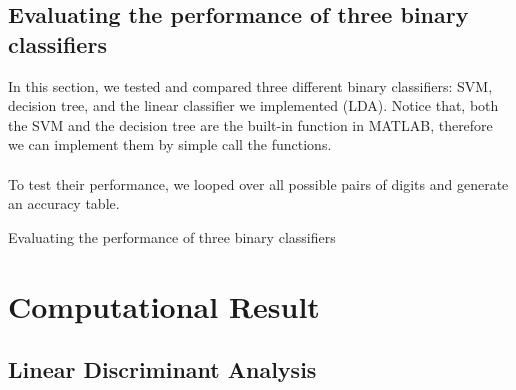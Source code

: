\documentclass{article}
\begin{document}
\subsection{Evaluating the performance of three binary classifiers}
In this section, we tested and compared three different binary classifiers: SVM, decision tree, and the linear classifier we implemented (LDA). Notice that, both the SVM and the decision tree are the built-in function in MATLAB, therefore we can implement them by simple call the functions. \\
~\\
To test their performance, we looped over all possible pairs of digits and generate an accuracy table.
\begin{algorithm}
\begin{algorithmic}
        \ENDFOR
    \ENDFOR
\end{algorithmic}
\caption{Evaluating the performance of three binary classifiers}
\end{algorithm}

\section{Computational Result}
\subsection{Linear Discriminant Analysis}
\end{document}

